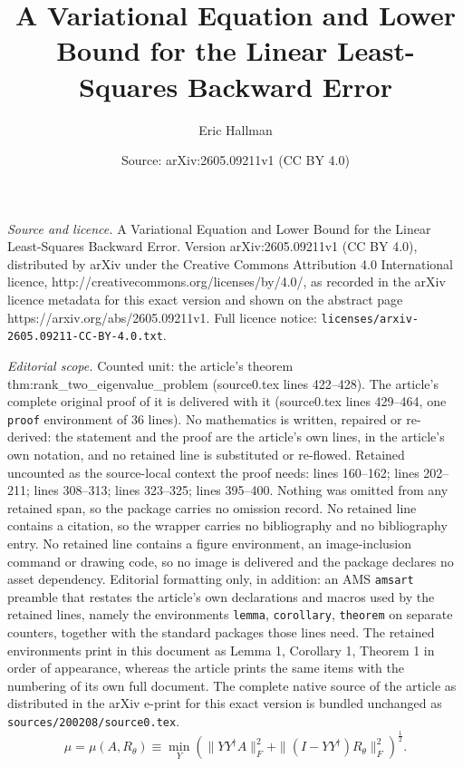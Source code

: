 \documentclass[10pt,a4paper]{amsart}
\title{A Variational Equation and Lower Bound for the Linear Least-Squares Backward Error}
\author{Eric Hallman}
\date{Source: arXiv:2605.09211v1 (CC BY 4.0)}
\begin{document}
\maketitle

\noindent\emph{Source and licence.} A Variational Equation and Lower Bound for the Linear Least-Squares Backward Error. Version arXiv:2605.09211v1 (CC BY 4.0), distributed by arXiv under the Creative Commons Attribution 4.0 International licence, http://creativecommons.org/licenses/by/4.0/, as recorded in the arXiv licence metadata for this exact version and shown on the abstract page https://arxiv.org/abs/2605.09211v1. Full licence notice: \texttt{licenses/arxiv-2605.09211-CC-BY-4.0.txt}.\par\smallskip

\noindent\textit{Editorial scope.} Counted unit: the article's theorem thm:rank\_two\_eigenvalue\_problem (source0.tex lines 422--428). The article's complete original proof of it is delivered with it (source0.tex lines 429--464, one \texttt{proof} environment of 36 lines). No mathematics is written, repaired or re-derived: the statement and the proof are the article's own lines, in the article's own notation, and no retained line is substituted or re-flowed.  Retained uncounted as the source-local context the proof needs: lines 160--162; lines 202--211; lines 308--313; lines 323--325; lines 395--400.  Nothing was omitted from any retained span, so the package carries no omission record.  No retained line contains a citation, so the wrapper carries no bibliography and no bibliography entry.  No retained line contains a figure environment, an image-inclusion command or drawing code, so no image is delivered and the package declares no asset dependency.  Editorial formatting only, in addition: an AMS \texttt{amsart} preamble that restates the article's own declarations and macros used by the retained lines, namely the environments \texttt{lemma}, \texttt{corollary}, \texttt{theorem} on separate counters, together with the standard packages those lines need.  The retained environments print in this document as Lemma 1, Corollary 1, Theorem 1 in order of appearance, whereas the article prints the same items with the numbering of its own full document.  The complete native source of the article as distributed in the arXiv e-print for this exact version is bundled unchanged as \texttt{sources/200208/source0.tex}.
\begin{equation}\label{def:mu_min_proj}
    \mu = \mu(A,R_\theta) \equiv \min_{Y} \left(\|YY^\dagger A\|_F^2 + \|(I-YY^\dagger)R_\theta\|_F^2\right)^{\frac{1}{2}}. 
\end{equation}
\end{document}
